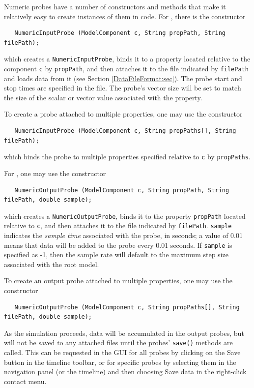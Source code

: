 Numeric probes have a number of constructors and methods that make it
relatively easy to create instances of them in code. For 
, there
is the constructor
%
\begin{lstlisting}
   NumericInputProbe (ModelComponent c, String propPath, String filePath);
\end{lstlisting}
%
which creates a {\tt NumericInputProbe}, binds it to a property
located relative to the component {\tt c} by {\tt propPath}, and then
attaches it to the file indicated by {\tt filePath} and loads data
from it (see Section \ref{DataFileFormat:sec}). The probe start and
stop times are specified in the file. The probe's vector size will be
set to match the size of the scalar or vector value associated with
the property.

To create a probe attached to multiple properties, one may use the
constructor
%
\begin{lstlisting}
   NumericInputProbe (ModelComponent c, String propPaths[], String filePath);
\end{lstlisting}
%
which binds the probe to multiple properties specified relative to
{\tt c} by {\tt propPaths}.

For , one may use
the constructor
%
\begin{lstlisting}
   NumericOutputProbe (ModelComponent c, String propPath, String filePath, double sample);
\end{lstlisting}
%
which creates a {\tt NumericOutputProbe}, binds it to the property
{\tt propPath} located relative to {\tt c}, and then attaches it to
the file indicated by {\tt filePath}. {\tt sample} indicates the {\it
sample time} associated with the probe, in seconds; a value of 0.01
means that data will be added to the probe every 0.01 seconds.  If
{\tt sample} is specified as -1, then the sample rate will default to
the maximum step size associated with the root model.  

To create an output probe attached to multiple properties, one may use the
constructor
%
\begin{lstlisting}
   NumericOutputProbe (ModelComponent c, String propPaths[], String filePath, double sample);
\end{lstlisting}
%

\begin{sideblock}
As the simulation proceeds, data will be accumulated in the output
probes, but will not be saved to any attached files until the probes'
{\tt save()} methods are called. This can be requested in the GUI for
all probes by clicking on the {\sf Save} button in the timeline
toolbar, or for specific probes by selecting them in the navigation
panel (or the timeline) and then choosing {\sf Save data} in the
right-click contact menu.
\end{sideblock}

